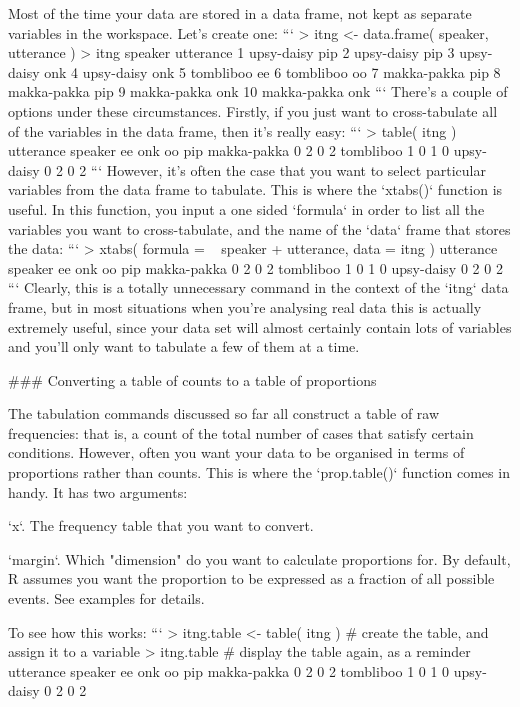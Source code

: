 Most of the time your data are stored in a data frame, not kept as separate variables in the workspace. Let's create one:
```
> itng <- data.frame( speaker, utterance )
> itng
       speaker utterance
1   upsy-daisy       pip
2   upsy-daisy       pip
3   upsy-daisy       onk
4   upsy-daisy       onk
5    tombliboo        ee
6    tombliboo        oo
7  makka-pakka       pip
8  makka-pakka       pip
9  makka-pakka       onk
10 makka-pakka       onk
```
There's a couple of options under these circumstances. Firstly, if you just want to cross-tabulate all of the variables in the data frame, then it's really easy:
```
> table( itng )
             utterance
speaker       ee onk oo pip
  makka-pakka  0   2  0   2
  tombliboo    1   0  1   0
  upsy-daisy   0   2  0   2
```
However, it's often the case that you want to select particular variables from the data frame to tabulate. This is where the `xtabs()` function is useful. In this function, you input a one sided `formula` in order to list all the variables you want to cross-tabulate, and the name of the `data` frame that stores the data:
```
> xtabs( formula = ~ speaker + utterance, data = itng )
             utterance
speaker       ee onk oo pip
  makka-pakka  0   2  0   2
  tombliboo    1   0  1   0
  upsy-daisy   0   2  0   2
```
Clearly, this is a totally unnecessary command in the context of the `itng` data frame, but in most situations when you're analysing real data this is actually extremely useful, since your data set will almost certainly contain lots of variables and you'll only want to tabulate a few of them at a time.



### Converting a table of counts to a table of proportions

The tabulation commands discussed so far all construct a table of raw frequencies: that is, a count of the total number of cases that satisfy certain conditions. However, often you want your data to be organised in terms of proportions rather than counts. This is where the `prop.table()` function comes in handy. It has two arguments:
 \itemsep 0pt
\item `x`. The frequency table that you want to convert.
\item `margin`. Which "dimension" do you want to calculate proportions for. By default, R assumes you want the proportion to be expressed as a fraction of all possible events. See examples for details.

To see how this works:
```
> itng.table <- table( itng )  # create the table, and assign it to a variable
> itng.table                   # display the table again, as a reminder
             utterance
speaker       ee onk oo pip
  makka-pakka  0   2  0   2
  tombliboo    1   0  1   0
  upsy-daisy   0   2  0   2
  
